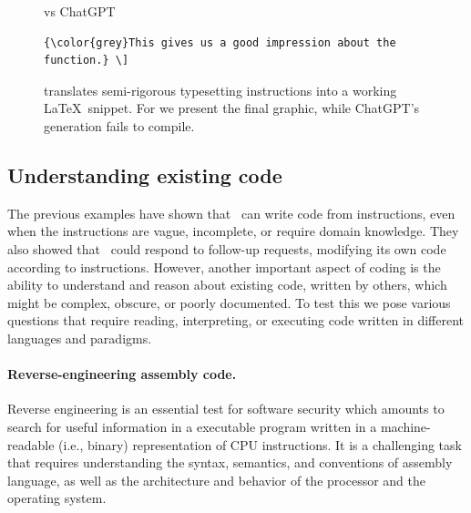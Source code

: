 \begin{figure}[H]
\begin{AIbox}{\DV vs ChatGPT}
\begin{verbatim}
{\color{grey}This gives us a good impression about the function.} \]
\end{verbatim}
\end{AIbox}
\caption{\DV translates semi-rigorous typesetting instructions into a working \LaTeX\ snippet. For \DV we present the final graphic, while ChatGPT's generation fails to compile. }
\label{fig:code-LaTeX}
\end{figure}

\subsection{Understanding existing code}
The previous examples have shown that \DV\ can write code from instructions, even when the instructions are vague, incomplete, or require domain knowledge. They also showed that \DV\ could respond to follow-up requests, modifying its own code according to instructions.
However, another important aspect of coding is the ability to understand and reason about existing code, written by others, which might be complex, obscure, or poorly documented. 
To test this we pose various questions that require reading, interpreting, or executing code written in different languages and paradigms.

\paragraph{Reverse-engineering assembly code.}
Reverse engineering is an essential test for software security which amounts to search for useful information in a executable program written in a machine-readable (i.e., binary) representation of CPU instructions. It is a challenging task that requires understanding the syntax, semantics, and conventions of assembly language, as well as the architecture and behavior of the processor and the operating system. 

